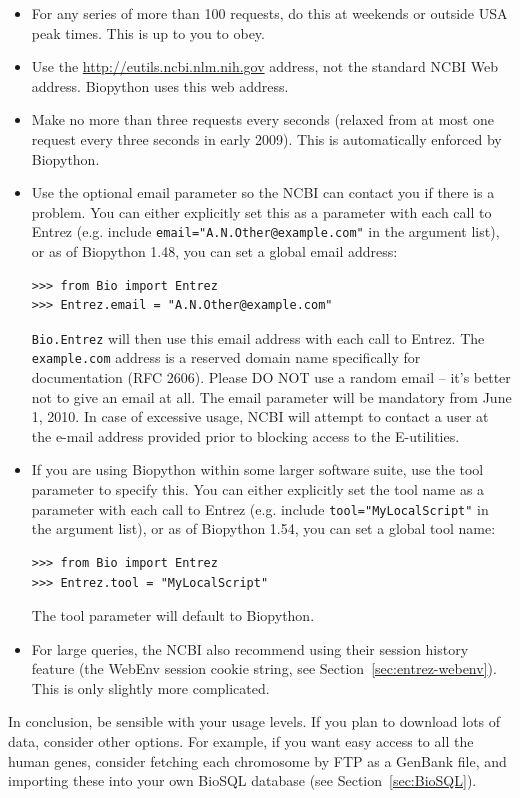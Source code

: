 \documentclass{report}
\begin{document}
\begin{itemize}
\item For any series of more than 100 requests, do this at weekends or outside USA peak times.  This is up to you to obey.
\item Use the \url{http://eutils.ncbi.nlm.nih.gov} address, not the standard NCBI Web address.  Biopython uses this web address.
\item Make no more than three requests every seconds (relaxed from at most one request every three seconds in early 2009).  This is automatically enforced by Biopython.
\item Use the optional email parameter so the NCBI can contact you if there is a problem.  You can either explicitly set this as a parameter with each call to Entrez (e.g. include {\tt email="A.N.Other@example.com"} in the argument list), or as of Biopython 1.48, you can set a global email address:
\begin{verbatim}
>>> from Bio import Entrez
>>> Entrez.email = "A.N.Other@example.com"
\end{verbatim}
{\tt Bio.Entrez} will then use this email address with each call to Entrez.  The {\tt example.com} address is a reserved domain name specifically for documentation (RFC 2606).  Please DO NOT use a random email -- it's better not to give an email at all. The email parameter will be mandatory from June 1, 2010. In case of excessive usage, NCBI will attempt to contact a user at the e-mail address provided prior to blocking access to the E-utilities.
\item If you are using Biopython within some larger software suite, use the tool parameter to specify this.  You can either explicitly set the tool name as a parameter with each call to Entrez (e.g. include {\tt tool="MyLocalScript"} in the argument list), or as of Biopython 1.54, you can set a global tool name:
\begin{verbatim}
>>> from Bio import Entrez
>>> Entrez.tool = "MyLocalScript"
\end{verbatim}
The tool parameter will default to Biopython.
\item For large queries, the NCBI also recommend using their session history feature (the WebEnv session cookie string, see Section~\ref{sec:entrez-webenv}).  This is only slightly more complicated.
\end{itemize}

In conclusion, be sensible with your usage levels.  If you plan to download lots of data, consider other options.  For example, if you want easy access to all the human genes, consider fetching each chromosome by FTP as a GenBank file, and importing these into your own BioSQL database (see Section~\ref{sec:BioSQL}).
\end{document}
